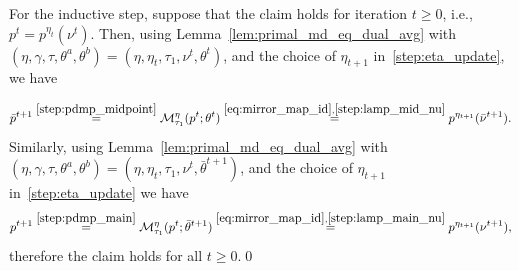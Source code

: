 \documentclass[10pt]{article}
\newcommand{\D}{\operatorname{D}}
\theoremstyle{plain}
\newtheorem{lemma}[theorem]{Lemma}
\theoremstyle{definition}
\theoremstyle{remark}
\begin{document}
    For the inductive step, suppose that the claim holds for iteration $t\geq 0$, i.e., $p^t=p^{\eta_t}(\nu^t)$. Then, using Lemma~\ref{lem:primal_md_eq_dual_avg} with $(\eta ,\gamma,\tau,\theta^a,\theta^b)=(\eta ,\eta_t,\tau_1,\nu^t,\theta^t)$, and the choice of $\eta_{t+1}$ in~\eqref{step:eta_update}, we have
    
    \begin{equation*}
        \bar p^{t+1}\stackrel{\eqref{step:pdmp_midpoint}}=\mathcal{M}_{\tau_1}^{\eta }(p^t;\theta^t)\stackrel{\eqref{eq:mirror_map_id},\eqref{step:lamp_mid_nu}}=p^{\eta_{t+1}}(\bar\nu^{t+1}).
    \end{equation*}
    Similarly, using Lemma~\ref{lem:primal_md_eq_dual_avg} with $(\eta ,\gamma,\tau,\theta^a,\theta^b)=(\eta ,\eta_t,\tau_1,\nu^t,\bar\theta^{t+1})$, and the choice of $\eta_{t+1}$ in~\eqref{step:eta_update} we have
    \begin{equation*}
        p^{t+1}\stackrel{\eqref{step:pdmp_main}}=\mathcal{M}_{\tau_1}^{\eta }(p^t;\bar\theta^{t+1})\stackrel{\eqref{eq:mirror_map_id},\eqref{step:lamp_main_nu}}=p^{\eta_{t+1}}(\nu^{t+1}),
    \end{equation*}
    therefore the claim holds for all $t\geq 0$.\qed
% 

\end{document}
